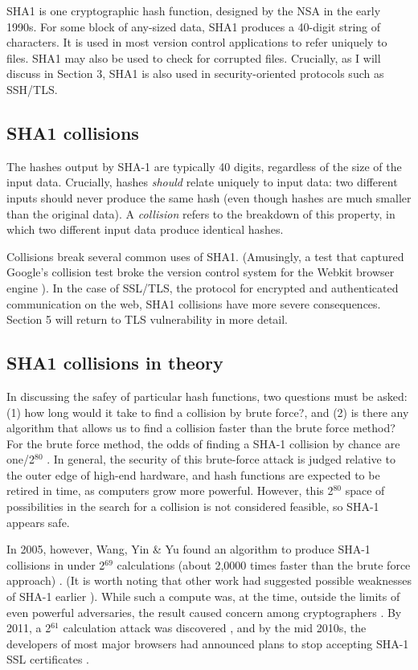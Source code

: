 \documentclass[sigconf]{acmart}
\begin{document}
SHA1 is one cryptographic hash function, designed by the NSA in the early 1990s.
For some block of any-sized data, SHA1 produces a 40-digit string of characters.
It is used in most version control applications to refer uniquely to files. SHA1 may also be used to check for corrupted files. 
Crucially, as I will discuss in Section 3, SHA1 is also used in security-oriented protocols such as SSH/TLS.


\subsection{SHA1 collisions}
\label{sec:orgd7b902f}

The hashes output by SHA-1 are typically 40 digits, regardless of the size of the input data.
Crucially, hashes \emph{should} relate uniquely to input data: 
two different inputs should never produce the same hash (even though hashes are much smaller than the original data).
A \emph{collision} refers to the breakdown of this property,
in which two different input data produce identical hashes.

Collisions break several common uses of SHA1. 
(Amusingly, a test that captured Google's collision test broke the version control system for the Webkit browser engine \cite{Koivisto2017}).
In the case of SSL/TLS, the protocol for encrypted and authenticated communication on the web, SHA1 collisions have more severe consequences.
Section 5 will return to TLS vulnerability in more detail.

\subsection{SHA1 collisions in theory}
\label{sec:org70172ff}

In discussing the safey of particular hash functions, two questions must be asked:
(1) how long would it take to find a collision by brute force?, and 
(2) is there any algorithm that allows us to find a collision faster than the brute force method?
For the brute force method, the odds of finding a SHA-1 collision by chance are one/2\(^{\text{80}}\)
\cite{Schneier2005}.
In general, the security of this brute-force attack is judged relative to the outer edge of high-end hardware, and hash functions are expected to be retired in time, as computers grow more powerful.
However, this 2\(^{\text{80}}\) space of possibilities in the search for a collision is not considered feasible, so SHA-1 appears safe.

In 2005, however, Wang, Yin \& Yu found an algorithm to produce SHA-1 collisions in under 2\(^{\text{69}}\) calculations (about 2,0000 times faster than the brute force approach)
\cite{Wang2005}.
(It is worth noting that other work had suggested possible weaknesses of SHA-1 earlier \cite{Biham2005}).
While such a compute was, at the time, outside the limits of even powerful adversaries,
the result caused concern among cryptographers \cite{Schneier2005}.
By 2011, a 2\(^{\text{61}}\) calculation attack was discovered \cite{Stevens2013a},
and by the mid 2010s, the developers of most major browsers had announced plans to stop accepting SHA-1 SSL certificates 
\cite{Mozilla2017,Sleevi2014}.
\end{document}
